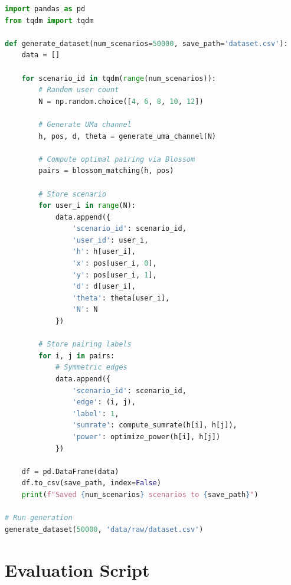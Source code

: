 \begin{lstlisting}[language=Python, caption={Training Dataset Creation}]
import pandas as pd
from tqdm import tqdm

def generate_dataset(num_scenarios=50000, save_path='dataset.csv'):
    data = []
    
    for scenario_id in tqdm(range(num_scenarios)):
        # Random user count
        N = np.random.choice([4, 6, 8, 10, 12])
        
        # Generate UMa channel
        h, pos, d, theta = generate_uma_channel(N)
        
        # Compute optimal pairing via Blossom
        pairs = blossom_matching(h, pos)
        
        # Store scenario
        for user_i in range(N):
            data.append({
                'scenario_id': scenario_id,
                'user_id': user_i,
                'h': h[user_i],
                'x': pos[user_i, 0],
                'y': pos[user_i, 1],
                'd': d[user_i],
                'theta': theta[user_i],
                'N': N
            })
        
        # Store pairing labels
        for i, j in pairs:
            # Symmetric edges
            data.append({
                'scenario_id': scenario_id,
                'edge': (i, j),
                'label': 1,
                'sumrate': compute_sumrate(h[i], h[j]),
                'power': optimize_power(h[i], h[j])
            })
    
    df = pd.DataFrame(data)
    df.to_csv(save_path, index=False)
    print(f"Saved {num_scenarios} scenarios to {save_path}")

# Run generation
generate_dataset(50000, 'data/raw/dataset.csv')
\end{lstlisting}

\section{Evaluation Script}

